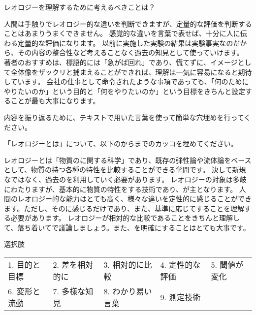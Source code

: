 \documentclass[uplatex,dvipdfmx,a4paper,11pt]{jsreport}
\begin{document}
\begin{qlist}
\begin{qlist2}
    \end{qlist2}
    \vspace{3mm}
	\qitem レオロジーを理解するために考えるべきことは？
		\begin{qlist2}
			\qitem 人間は手触りでレオロジー的な違いを判断できますが、定量的な評価を判断することはあまりうまくできません。
            \qitem 感覚的な違いを言葉で表せば、十分に人に伝わる定量的な評価になります。
            \qitem 以前に実施した実験の結果は実験事実なのだから、その内容の整合性など考えることなく過去の知見として使っていけます。
			\qitem 著者のおすすめは、標語的には「急がば回れ」であり、慌てずに、イメージとして全体像をザックリと捕まえることができれば、理解は一気に容易になると期待しています。
			\qitem 会社の仕事として命令されたような事項であっても、「何のためにやりたいのか」という目的と「何をやりたいのか」という目標をきちんと設定することが最も大事になります。
		\end{qlist2}
\end{qlist}

内容を振り返るために、テキストで用いた言葉を使って簡単な穴埋めを行ってください。

\begin{qparts}
    \qpart 「レオロジーとは」について、以下のからまでのカッコを埋めてください。
    \begin{qlist}
      \qitem レオロジーとは「物質の\qbox{}に関する科学」であり、既存の弾性論や流体論をベースとして、物質の持つ各種の特性を比較することができる学問です。
      決して新規な\qbox{}ではなく、過去の\qbox{}を利用していく必要があります。
      \qitem レオロジーの対象は多岐にわたりますが、基本的に物質の特性を\qbox{}する技術であり、\qbox{}が主となります。
      \qitem 人間のレオロジー的な能力はとても高く、様々な違いを定性的に感じることができます。ただし、その\qbox{}に感じるだけであり、また、基準に応じて\qbox{}することを理解する必要があります。
      \qitem レオロジーが相対的な比較であることをきちんと理解して、落ち着いて\qbox{}で議論しましょう。また、\qbox{}を明確にすることはとても大事です。
    \end{qlist}

    \begin{itembox}[l]{選択肢}
      \begin{center}
        \begin{tabular}{lllll}
                1. 目的と目標&2. 差を相対的に&3. 相対的に比較&4. 定性的な評価 & 5. 閾値が変化 \\
                6. 変形と流動&7. 多様な知見&8. わかり易い言葉 & 9. 測定技術
        \end{tabular}
      \end{center}
    \end{itembox}
\end{qparts}
\end{document}
